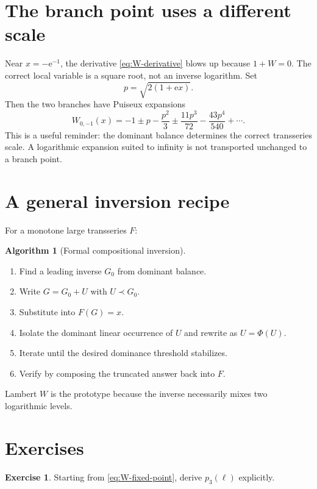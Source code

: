 \documentclass[11pt,openany]{book}
\theoremstyle{definition}
\newtheorem{exercise}{Exercise}[chapter]
\newtheorem{algorithm}{Algorithm}[chapter]
\theoremstyle{plain}
\theoremstyle{remark}
\newcommand{\e}{\mathrm{e}}
\newcommand{\precdom}{\prec}
\begin{document}
\section{The branch point uses a different scale}

Near $x=-\e^{-1}$, the derivative \cref{eq:W-derivative} blows up because $1+W=0$. The correct local variable is a square root, not an inverse logarithm. Set
\[
 p=\sqrt{2(1+\e x)}.
\]
Then the two branches have Puiseux expansions
\begin{equation}\label{eq:W-branchpoint}
 W_{0,-1}(x)
 =-1\pm p-\frac{p^2}{3}
 \pm\frac{11p^3}{72}-\frac{43p^4}{540}+\cdots.
\end{equation}
This is a useful reminder: the dominant balance determines the correct transseries scale. A logarithmic expansion suited to infinity is not transported unchanged to a branch point.

\section{A general inversion recipe}

For a monotone large transseries $F$:

\begin{algorithm}[Formal compositional inversion]
\begin{enumerate}
\item Find a leading inverse $G_0$ from dominant balance.
\item Write $G=G_0+U$ with $U\precdom G_0$.
\item Substitute into $F(G)=x$.
\item Isolate the dominant linear occurrence of $U$ and rewrite as $U=\Phi(U)$.
\item Iterate until the desired dominance threshold stabilizes.
\item Verify by composing the truncated answer back into $F$.
\end{enumerate}
\end{algorithm}

Lambert $W$ is the prototype because the inverse necessarily mixes two logarithmic levels.

\section{Exercises}

\begin{exercise}
Starting from \cref{eq:W-fixed-point}, derive $p_3(\ell)$ explicitly.
\end{exercise}
\end{document}

